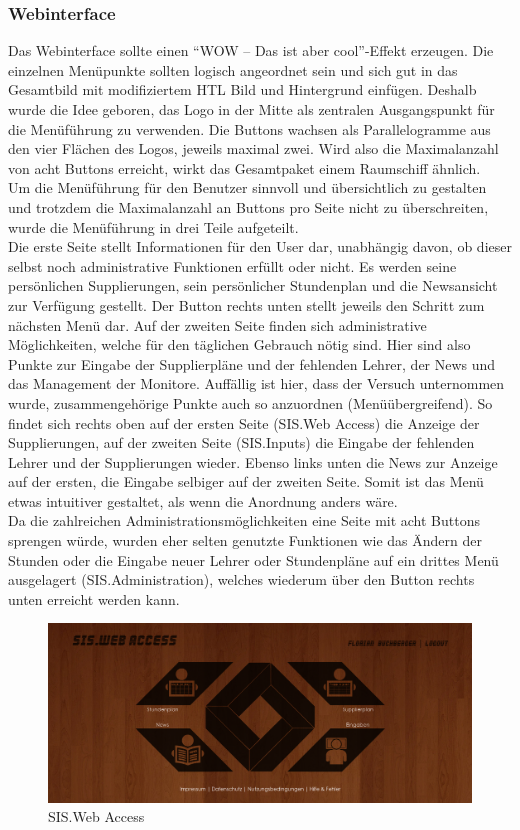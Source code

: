 \subsubsection{Webinterface}
\label{sec:content_draft_design_web}
Das Webinterface sollte einen \enquote{WOW – Das ist aber cool}-Effekt erzeugen. Die einzelnen Menüpunkte sollten logisch angeordnet sein und sich gut in das Gesamtbild mit modifiziertem HTL Bild und Hintergrund einfügen. Deshalb wurde die Idee geboren, das Logo in der Mitte als zentralen Ausgangspunkt für die Menüführung zu verwenden. Die Buttons wachsen als Parallelogramme aus den vier Flächen des Logos, jeweils maximal zwei. Wird also die Maximalanzahl von acht Buttons erreicht, wirkt das Gesamtpaket einem Raumschiff ähnlich.\\
Um die Menüführung für den Benutzer sinnvoll und übersichtlich zu gestalten und trotzdem die Maximalanzahl an Buttons pro Seite nicht zu überschreiten, wurde die Menüführung in drei Teile aufgeteilt.\\
Die erste Seite stellt Informationen für den User dar, unabhängig davon, ob dieser selbst noch administrative Funktionen erfüllt oder nicht. Es werden seine persönlichen Supplierungen, sein persönlicher Stundenplan und die Newsansicht zur Verfügung gestellt. Der Button rechts unten stellt jeweils den Schritt zum nächsten Menü dar. Auf der zweiten Seite finden sich administrative Möglichkeiten, welche für den täglichen Gebrauch nötig sind. Hier sind also Punkte zur Eingabe der Supplierpläne und der fehlenden Lehrer, der News und das Management der Monitore. Auffällig ist hier, dass der Versuch unternommen wurde, zusammengehörige Punkte auch so anzuordnen (Menüübergreifend). So findet sich rechts oben auf der ersten Seite (SIS.Web Access) die Anzeige der Supplierungen, auf der zweiten Seite (SIS.Inputs) die Eingabe der fehlenden Lehrer und der Supplierungen wieder. Ebenso links unten die News zur Anzeige auf der ersten, die Eingabe selbiger auf der zweiten Seite. Somit ist das Menü etwas intuitiver gestaltet, als wenn die Anordnung anders wäre.\\
Da die zahlreichen Administrationsmöglichkeiten eine Seite mit acht Buttons sprengen würde, wurden eher selten genutzte Funktionen wie das Ändern der Stunden oder die Eingabe neuer Lehrer oder Stundenpläne auf ein drittes Menü ausgelagert (SIS.Administration), welches wiederum über den Button rechts unten erreicht werden kann.\\
\begin{figure}[H]
\centering
\includegraphics[keepaspectratio=true, width=14cm]{images/screenshots/web-access_nohover.png}
\caption{SIS.Web Access}
\label{fig:content_draft_design_webaccess}
\end{figure}
